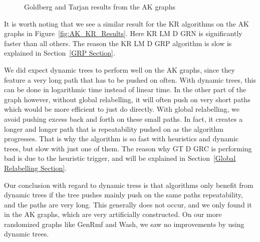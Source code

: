 \begin{figure}[h]
\caption{Goldberg and Tarjan results from the AK graphs}
\label{fig:AK_GT_Results}
\end{figure}

It is worth noting that we see a similar result for the KR algorithms on the AK graphs in Figure~\ref{fig:AK_KR_Results}. 
Here KR LM D GRN is significantly faster than all others. 
The reason the KR LM D GRP algorithm is slow is explained in Section~\ref{GRP Section}.

We did expect dynamic trees to perform well on the AK graphs, since they feature a very long path that has to be pushed on often. With dynamic trees, this can be done in logarithmic time instead of linear time.
In the other part of the graph however, without global relabelling, it will often push on very short paths which would be more efficient to just do directly. 
With global relabelling, we avoid pushing excess back and forth on these small paths. 
In fact, it creates a longer and longer path that is repeatability pushed on as the algorithm progresses. That is why the algorithm is so fast with heuristics and dynamic trees, but slow with just one of them.
The reason why GT D GRC is performing bad is due to the heuristic trigger, and will be explained in Section~\ref{Global Relabelling Section}.

Our conclusion with regard to dynamic tress is that algorithms only benefit from dynamic trees if the tree pushes mainly push on the same paths repeatability, and the paths are very long.
This generally does not occur, and we only found it in the AK graphs, which are very artificially constructed. On our more randomized graphs like GenRmf and Wash, we saw no improvements by using dynamic trees.

